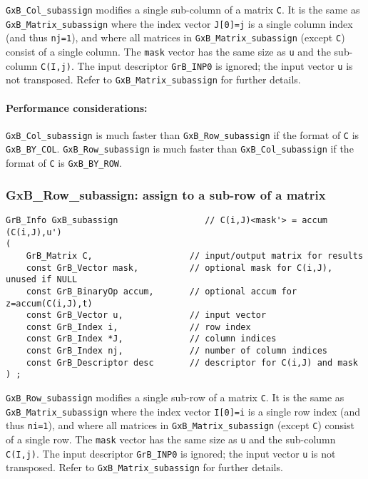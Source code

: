 \documentclass[12pt]{article}
\begin{document}
\verb'GxB_Col_subassign' modifies a single sub-column of a matrix \verb'C'.  It
is the same as \verb'GxB_Matrix_subassign' where the index vector \verb'J[0]=j'
is a single column index (and thus \verb'nj=1'), and where all matrices in
\verb'GxB_Matrix_subassign' (except \verb'C') consist of a single column.  The
\verb'mask' vector has the same size as \verb'u' and the sub-column
\verb'C(I,j)'.  The input descriptor \verb'GrB_INP0' is ignored; the input
vector \verb'u' is not transposed.  Refer to \verb'GxB_Matrix_subassign' for
further details.

\paragraph{\bf Performance considerations:} %
\verb'GxB_Col_subassign' is much faster than \verb'GxB_Row_subassign' if the
format of \verb'C' is \verb'GxB_BY_COL'.  \verb'GxB_Row_subassign' is much
faster than \verb'GxB_Col_subassign' if the format of \verb'C' is
\verb'GxB_BY_ROW'.

\subsubsection{{\sf GxB\_Row\_subassign:} assign to a sub-row of a matrix}
\label{subassign_row}

\begin{mdframed}[userdefinedwidth=6in]
{\footnotesize
\begin{verbatim}
GrB_Info GxB_subassign                 // C(i,J)<mask'> = accum (C(i,J),u')
(
    GrB_Matrix C,                   // input/output matrix for results
    const GrB_Vector mask,          // optional mask for C(i,J), unused if NULL
    const GrB_BinaryOp accum,       // optional accum for z=accum(C(i,J),t)
    const GrB_Vector u,             // input vector
    const GrB_Index i,              // row index
    const GrB_Index *J,             // column indices
    const GrB_Index nj,             // number of column indices
    const GrB_Descriptor desc       // descriptor for C(i,J) and mask
) ;
\end{verbatim} } \end{mdframed}

\verb'GxB_Row_subassign' modifies a single sub-row of a matrix \verb'C'.  It is
the same as \verb'GxB_Matrix_subassign' where the index vector \verb'I[0]=i' is
a single row index (and thus \verb'ni=1'), and where all matrices in
\verb'GxB_Matrix_subassign' (except \verb'C') consist of a single row.  The
\verb'mask' vector has the same size as \verb'u' and the sub-column
\verb'C(I,j)'.  The input descriptor \verb'GrB_INP0' is ignored; the input
vector \verb'u' is not transposed.  Refer to \verb'GxB_Matrix_subassign' for
further details.
\end{document}
